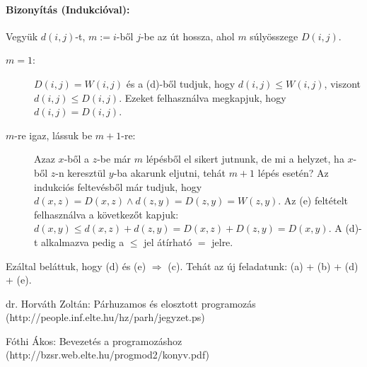 \documentclass[12pt]{article}
\begin{document}
	\paragraph{Bizonyítás (Indukcióval):}
	Vegyük $d(i,j)$-t, $m := i$-ből $j$-be az út hossza, ahol $m$ súlyösszege $D(i,j)$.
	\begin{description}
		\item[$m=1$:] $D(i,j) = W(i,j)$ és a (d)-ből tudjuk, hogy $d(i,j) \le W(i,j)$, viszont $d(i,j) \le D(i,j)$. Ezeket felhasználva megkapjuk, hogy $d(i,j) = D(i,j)$.
		\item[$m$-re igaz, lássuk be $m+1$-re:] Azaz $x$-ből a $z$-be már $m$ lépésből el sikert jutnunk, de mi a helyzet, ha $x$-ből $z$-n keresztül $y$-ba akarunk eljutni, tehát $m+1$ lépés esetén? Az indukciós feltevésből már tudjuk, hogy $d(x,z) = D(x,z) \land d(z,y)=D(z,y)=W(z,y)$. Az (e) feltételt felhasználva a következőt kapjuk: $d(x,y) \le d(x,z) + d(z,y) = D(x,z) + D(z,y) = D(x, y)$. A (d)-t alkalmazva pedig a $\le$ jel átírható $=$ jelre.
	\end{description}
	Ezáltal beláttuk, hogy (d) és (e) $\Rightarrow$ (c). Tehát az új feladatunk: (a) + (b) + (d) + (e).
	
	
	\newpage
	\begin{thebibliography}{9}
		\raggedright
		dr. Horváth Zoltán: Párhuzamos és elosztott programozás (http://people.inf.elte.hu/hz/parh/jegyzet.ps)
		
		Fóthi Ákos: Bevezetés a programozáshoz (http://bzsr.web.elte.hu/progmod2/konyv.pdf)
		
	\end{thebibliography}
\end{document}
